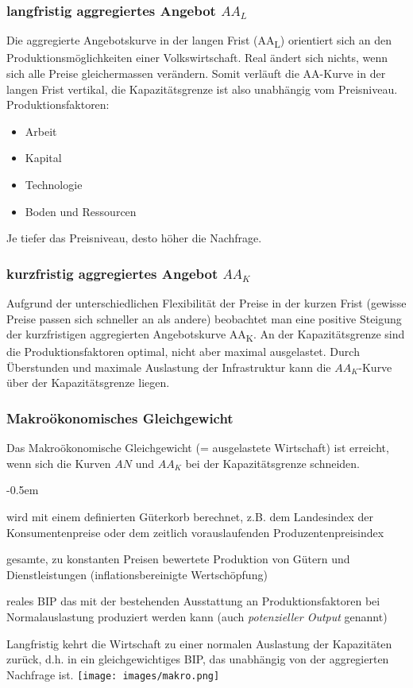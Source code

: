 \begin{multicols}{2}
\subsubsection{langfristig aggregiertes Angebot $AA_L$}
Die aggregierte Angebotskurve in der langen Frist (AA\textsubscript{L}) orientiert sich an den Produktionsmöglichkeiten einer Volkswirtschaft. Real ändert sich nichts, wenn sich alle Preise gleichermassen verändern. Somit verläuft die AA-Kurve in der langen Frist vertikal, die Kapazitätsgrenze ist also unabhängig vom Preisniveau.\\
Produktionsfaktoren:
\begin{itemize}
	\item Arbeit
	\item Kapital
	\item Technologie
	\item Boden und Ressourcen
\end{itemize}
Je tiefer das Preisniveau, desto höher die Nachfrage.
\columnbreak
\subsubsection{kurzfristig aggregiertes Angebot $AA_K$}
Aufgrund der unterschiedlichen Flexibilität der Preise in der kurzen Frist (gewisse Preise passen sich schneller an als andere) beobachtet man eine positive Steigung der kurzfristigen aggregierten Angebotskurve AA\textsubscript{K}. An der Kapazitätsgrenze sind die Produktionsfaktoren optimal, nicht aber maximal ausgelastet. Durch Überstunden und maximale Auslastung der Infrastruktur kann die $AA_K$-Kurve über der Kapazitätsgrenze liegen.
\end{multicols}
\clearpage

\begin{multicols}{2}
\subsubsection{Makroökonomisches Gleichgewicht}
Das Makroökonomische Gleichgewicht (= ausgelastete Wirtschaft) ist erreicht, wenn sich die Kurven $AN$ und $AA_K$ bei der Kapazitätsgrenze schneiden. 
\begin{description}
	\itemsep-0.5em
	\item [Preisniveau:] wird mit einem definierten Güterkorb berechnet, z.B. dem Landesindex der Konsumentenpreise oder dem zeitlich vorauslaufenden Produzentenpreisindex
	\item [reales BIP:] gesamte, zu konstanten Preisen bewertete Produktion von Gütern und Dienstleistungen (inflationsbereinigte Wertschöpfung)
	\item [Kapazitätsgrenze:] reales BIP das mit der bestehenden Ausstattung an Produktionsfaktoren bei Normalauslastung produziert werden kann (auch \textit{potenzieller Output} genannt)
\end{description}
\columnbreak
Langfristig kehrt die Wirtschaft zu einer normalen Auslastung der Kapazitäten zurück, d.h. in ein gleichgewichtiges BIP, das unabhängig von der aggregierten Nachfrage ist.
\texttt{[image: images/makro.png]}
\end{multicols}

